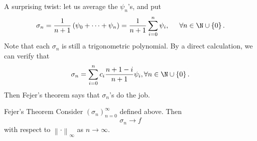 \documentclass[pmath450]{subfiles}
\begin{document}
    A surprising twist: let us average the $\psi_n$'s, and put
    \begin{equation}
        \sigma_n = \frac{1}{n+1} \left( \psi_0 + \cdots + \psi_n \right) = \frac{1}{n+1} \sum^{n}_{i=0}\psi_i, \hspace{0.5cm}\forall n\in\N\cup\left\lbrace 0 \right\rbrace.
    \end{equation}
    Note that each $\sigma_n$ is still a trigonometric polynomial. By a direct calculation, we can verify that
    \begin{equation}
        \sigma_n = \sum^{n}_{i=0} c_i \frac{n+1-i}{n+1} \psi_i, \forall n\in\N\cup\left\lbrace 0 \right\rbrace.
    \end{equation}
    Then Fejer's theorem says that $\sigma_n$'s do the job.

    \begin{theorem}{Fejer's Theorem}
        Consider $\left( \sigma_{n} \right)^{\infty}_{n=0}$ defined above. Then
        \begin{equation*}
            \sigma_n\to f
        \end{equation*}
        with respect to $\left\lVert \cdot\right\rVert_{\infty}$ as $n\to\infty$.
    \end{theorem}

    \rruleline
    
\end{document}
